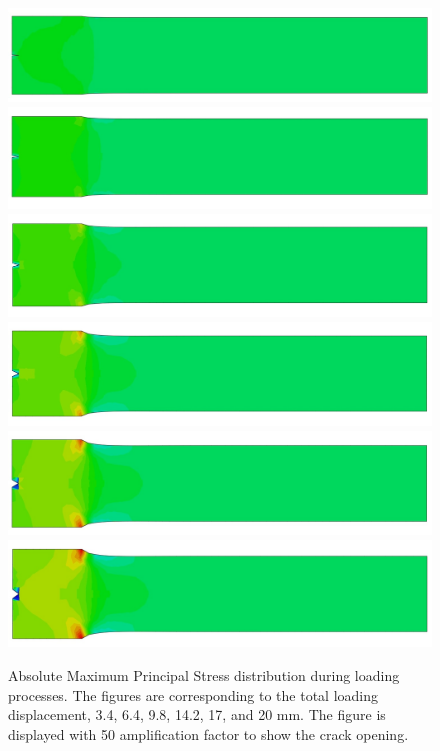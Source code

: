\documentclass[preprint,review,12pt]{elsarticle}
\begin{document}
\begin{figure}[htbp]
\begin{minipage}[t]{0.28\textwidth}
\end{minipage}
\begin{minipage}[t]{0.65\textwidth}
\centering
\includegraphics[width=\textwidth]{Abaqus/DSID/DSID_1.jpg}
\includegraphics[width=\textwidth]{Abaqus/DSID/DSID_2.jpg}
\includegraphics[width=\textwidth]{Abaqus/DSID/DSID_3.jpg}
\includegraphics[width=\textwidth]{Abaqus/DSID/DSID_4.jpg}
\includegraphics[width=\textwidth]{Abaqus/DSID/DSID_5.jpg}
\includegraphics[width=\textwidth]{Abaqus/DSID/DSID_6.jpg}
\end{minipage}
\caption{Absolute Maximum Principal Stress distribution during loading processes. The figures are corresponding to the total loading displacement, 3.4, 6.4, 9.8, 14.2, 17, and 20 mm. The figure is displayed with 50 amplification factor to show the crack opening.}
\label{fig:DSIDResults}
\end{figure}
\end{document}
